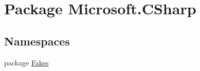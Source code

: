 \hypertarget{namespace_microsoft_1_1_c_sharp}{\section{Package Microsoft.\-C\-Sharp}
\label{namespace_microsoft_1_1_c_sharp}
}
\subsection*{Namespaces}
\begin{DoxyCompactItemize}
\item 
package \hyperlink{namespace_microsoft_1_1_c_sharp_1_1_fakes}{Fakes}
\end{DoxyCompactItemize}
